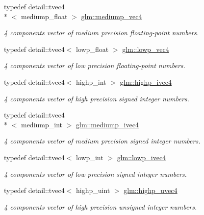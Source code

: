 \begin{DoxyCompactItemize}
typedef detail\-::tvec4\\*
$<$ mediump\-\_\-float $>$ \hyperlink{group__core__precision_ga592096fcf2ef1662f2c0dbbc7754e80c}{glm\-::mediump\-\_\-vec4}
\begin{DoxyCompactList}\small\item\em 4 components vector of medium precision floating-\/point numbers. \end{DoxyCompactList}\item 
typedef detail\-::tvec4$<$ lowp\-\_\-float $>$ \hyperlink{group__core__precision_gabc7a12b5fe2a8b5b4d11961c284637dc}{glm\-::lowp\-\_\-vec4}
\begin{DoxyCompactList}\small\item\em 4 components vector of low precision floating-\/point numbers. \end{DoxyCompactList}\item 
typedef detail\-::tvec4$<$ highp\-\_\-int $>$ \hyperlink{group__core__precision_ga69b5a957eb1f6a1201cd7eb9a6ac04c5}{glm\-::highp\-\_\-ivec4}
\begin{DoxyCompactList}\small\item\em 4 components vector of high precision signed integer numbers. \end{DoxyCompactList}\item 
typedef detail\-::tvec4\\*
$<$ mediump\-\_\-int $>$ \hyperlink{group__core__precision_gaabd2534479a6e7e493a7362b9f4c63cd}{glm\-::mediump\-\_\-ivec4}
\begin{DoxyCompactList}\small\item\em 4 components vector of medium precision signed integer numbers. \end{DoxyCompactList}\item 
typedef detail\-::tvec4$<$ lowp\-\_\-int $>$ \hyperlink{group__core__precision_gaf6a3d7f4b43a36e905511bc0753e3158}{glm\-::lowp\-\_\-ivec4}
\begin{DoxyCompactList}\small\item\em 4 components vector of low precision signed integer numbers. \end{DoxyCompactList}\item 
typedef detail\-::tvec4$<$ highp\-\_\-uint $>$ \hyperlink{group__core__precision_gadc25684638be5d1caeb63d3d5e55feec}{glm\-::highp\-\_\-uvec4}
\begin{DoxyCompactList}\small\item\em 4 components vector of high precision unsigned integer numbers. \end{DoxyCompactList}\item 

\end{DoxyCompactItemize}
